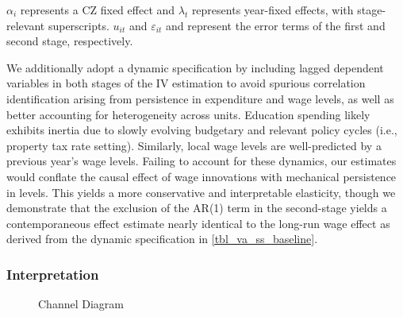 \documentclass[
  10pt,
]{article}
\begin{document}
\(\alpha_i\) represents a CZ fixed effect and \(\lambda_t\) represents
year-fixed effects, with stage-relevant superscripts. \(u_{it}\) and
\(\varepsilon_{it}\) and represent the error terms of the first and
second stage, respectively.

We additionally adopt a dynamic specification by including lagged
dependent variables in both stages of the IV estimation to avoid
spurious correlation identification arising from persistence in
expenditure and wage levels, as well as better accounting for
heterogeneity across units. Education spending likely exhibits inertia
due to slowly evolving budgetary and relevant policy cycles (i.e.,
property tax rate setting). Similarly, local wage levels are
well-predicted by a previous year's wage levels. Failing to account for
these dynamics, our estimates would conflate the causal effect of wage
innovations with mechanical persistence in levels. This yields a more
conservative and interpretable elasticity, though we demonstrate that
the exclusion of the AR(1) term in the second-stage yields a
contemporaneous effect estimate nearly identical to the long-run wage
effect as derived from the dynamic specification in
\autoref{tbl_va_ss_baseline}.

\subsubsection{Interpretation}\label{interpretation}

\begin{figure}[H]
\centering
\caption{Channel Diagram}
\label{fig:channel-diagram}
\end{figure}
\end{document}
